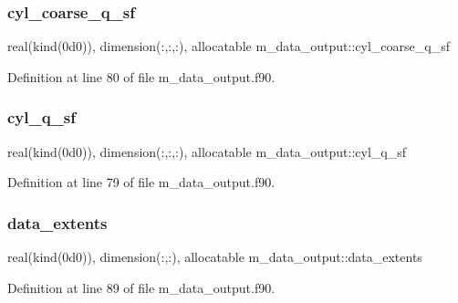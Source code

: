 \subsubsection{\texorpdfstring{cyl\+\_\+coarse\+\_\+q\+\_\+sf}{cyl\_coarse\_q\_sf}}
{\footnotesize\ttfamily real(kind(0d0)), dimension(\+:,\+:,\+:), allocatable m\+\_\+data\+\_\+output\+::cyl\+\_\+coarse\+\_\+q\+\_\+sf}



Definition at line 80 of file m\+\_\+data\+\_\+output.\+f90.

\mbox{\label{namespacem__data__output_a0a9ac4d26ce8ac2ea87cacf581b49692}} 
\subsubsection{\texorpdfstring{cyl\+\_\+q\+\_\+sf}{cyl\_q\_sf}}
{\footnotesize\ttfamily real(kind(0d0)), dimension(\+:,\+:,\+:), allocatable m\+\_\+data\+\_\+output\+::cyl\+\_\+q\+\_\+sf}



Definition at line 79 of file m\+\_\+data\+\_\+output.\+f90.

\mbox{\label{namespacem__data__output_a10cecf686032e4df4cd0b9835b159d07}} 
\subsubsection{\texorpdfstring{data\+\_\+extents}{data\_extents}}
{\footnotesize\ttfamily real(kind(0d0)), dimension(\+:,\+:), allocatable m\+\_\+data\+\_\+output\+::data\+\_\+extents}



Definition at line 89 of file m\+\_\+data\+\_\+output.\+f90.

\mbox{\label{namespacem__data__output_a5b3bbbc3392c3196bee8219d550fd9aa}} 
